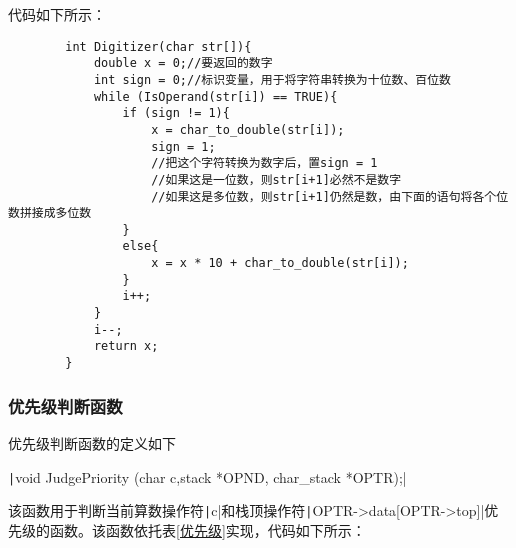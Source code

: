 \documentclass[10pt,a4paper]{article}
\begin{document}
	\noindent 代码如下所示：
	\begin{verbatim}
		int Digitizer(char str[]){
			double x = 0;//要返回的数字
			int sign = 0;//标识变量，用于将字符串转换为十位数、百位数
			while (IsOperand(str[i]) == TRUE){
				if (sign != 1){
					x = char_to_double(str[i]);
					sign = 1;
					//把这个字符转换为数字后，置sign = 1
					//如果这是一位数，则str[i+1]必然不是数字
					//如果这是多位数，则str[i+1]仍然是数，由下面的语句将各个位数拼接成多位数
				}
				else{
					x = x * 10 + char_to_double(str[i]);
				}
				i++;
			}
			i--;
			return x;
		}
	\end{verbatim}
	\subsubsection{优先级判断函数}
	\noindent 优先级判断函数的定义如下
	\begin{center}
		\texttt|void JudgePriority (char c,stack *OPND, char_stack *OPTR);|
	\end{center}
	该函数用于判断当前算数操作符\texttt|c|和栈顶操作符\texttt|OPTR->data[OPTR->top]|优先级的函数。该函数依托表\ref{优先级}实现，代码如下所示：
\end{document}
